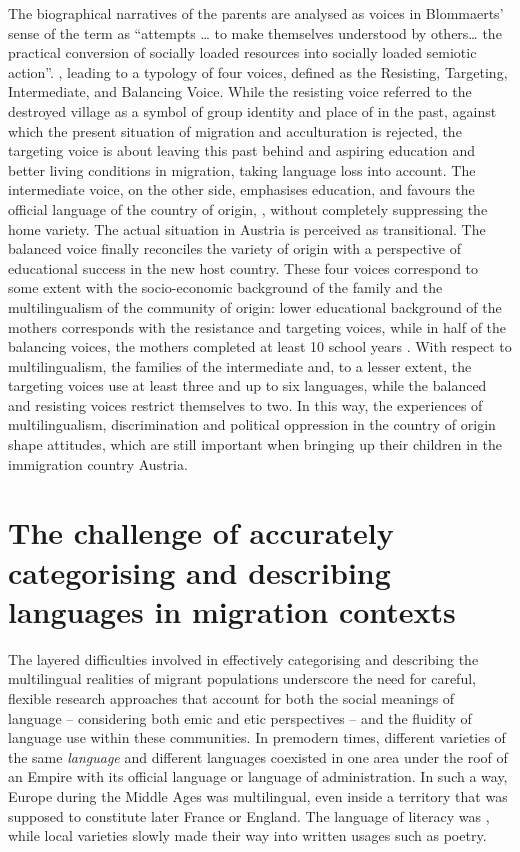 \documentclass[output=paper,colorlinks,citecolor=brown]{langscibook}
\begin{document}
The biographical narratives of the parents are analysed as voices in Blommaerts' sense of the term as ``attempts … to make themselves understood by others… the practical conversion of socially loaded resources into socially loaded semiotic action''. \citep[427]{blommaert2008}, leading to a typology of four voices, defined as the Resisting, Targeting, Intermediate, and Balancing Voice. While the resisting voice referred to the destroyed  village as a symbol of group identity and place of  in the past, against which the present situation of migration and acculturation is rejected, the targeting voice is about leaving this past behind and aspiring education and better living conditions in migration, taking language loss into account. The intermediate voice, on the other side, emphasises education, and favours the official language of the country of origin, , without completely suppressing the  home variety. The actual situation in Austria is perceived as transitional. The balanced voice finally reconciles the variety of origin with a perspective of educational success in the new host country. These four voices correspond to some extent with the socio-economic background of the family and the multilingualism of the community of origin: lower educational background of the mothers corresponds with the resistance and targeting voices, while in half of the balancing voices, the mothers completed at least 10 school years \citep{brizic2021}. With respect to multilingualism, the families of the intermediate and, to a lesser extent, the targeting voices use at least three and up to six languages, while the balanced and resisting voices restrict themselves to two. In this way, the experiences of multilingualism, discrimination and political oppression in the country of origin shape attitudes, which are still important when bringing up their children in the immigration country Austria. 

\section{The challenge of accurately categorising and describing languages in migration contexts}\label{Intro.ss.5}

The layered difficulties involved in effectively categorising and describing the multilingual realities of migrant populations underscore the need for careful, flexible research approaches that account for both the social meanings of language -- considering both emic and etic perspectives -- and the fluidity of language use within these communities. In premodern times, different varieties of the same \textit{language} and different languages coexisted in one area under the roof of an Empire with its official language or language of administration. In such a way, Europe during the Middle Ages was multilingual, even inside a territory that was supposed to constitute later France or England. The language of literacy was , while local varieties slowly made their way into written usages such as poetry. 
\end{document}
